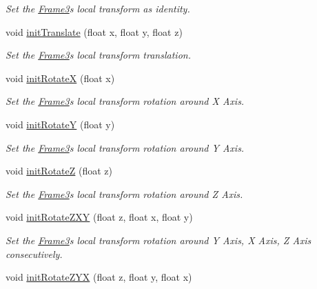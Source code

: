 \begin{DoxyCompactItemize}
\begin{DoxyCompactList}\small\item\em Set the \hyperlink{class_magnum_1_1_frame3}{Frame3}\textquotesingle{}s local transform as identity. \end{DoxyCompactList}\item 
void \hyperlink{class_magnum_1_1_frame3_ad4a2ee8f4ba31539809e9b1c78c179a0}{init\+Translate} (float x, float y, float z)
\begin{DoxyCompactList}\small\item\em Set the \hyperlink{class_magnum_1_1_frame3}{Frame3}\textquotesingle{}s local transform translation. \end{DoxyCompactList}\item 
void \hyperlink{class_magnum_1_1_frame3_a7ab1794685e58d63039f209b75e81911}{init\+RotateX} (float x)
\begin{DoxyCompactList}\small\item\em Set the \hyperlink{class_magnum_1_1_frame3}{Frame3}\textquotesingle{}s local transform rotation around X Axis. \end{DoxyCompactList}\item 
void \hyperlink{class_magnum_1_1_frame3_a2f2ca26808ee2a9e1adb225fefc4c6f5}{init\+RotateY} (float y)
\begin{DoxyCompactList}\small\item\em Set the \hyperlink{class_magnum_1_1_frame3}{Frame3}\textquotesingle{}s local transform rotation around Y Axis. \end{DoxyCompactList}\item 
void \hyperlink{class_magnum_1_1_frame3_a383554882baf298d04a135357f37a8e3}{init\+RotateZ} (float z)
\begin{DoxyCompactList}\small\item\em Set the \hyperlink{class_magnum_1_1_frame3}{Frame3}\textquotesingle{}s local transform rotation around Z Axis. \end{DoxyCompactList}\item 
void \hyperlink{class_magnum_1_1_frame3_a387d816bf2388f018f2f482845c9da3c}{init\+Rotate\+Z\+XY} (float z, float x, float y)
\begin{DoxyCompactList}\small\item\em Set the \hyperlink{class_magnum_1_1_frame3}{Frame3}\textquotesingle{}s local transform rotation around Y Axis, X Axis, Z Axis consecutively. \end{DoxyCompactList}\item 
void \hyperlink{class_magnum_1_1_frame3_a53c21c0b5e6d17a5ee15315ccb27c658}{init\+Rotate\+Z\+YX} (float z, float y, float x)

\end{DoxyCompactItemize}
